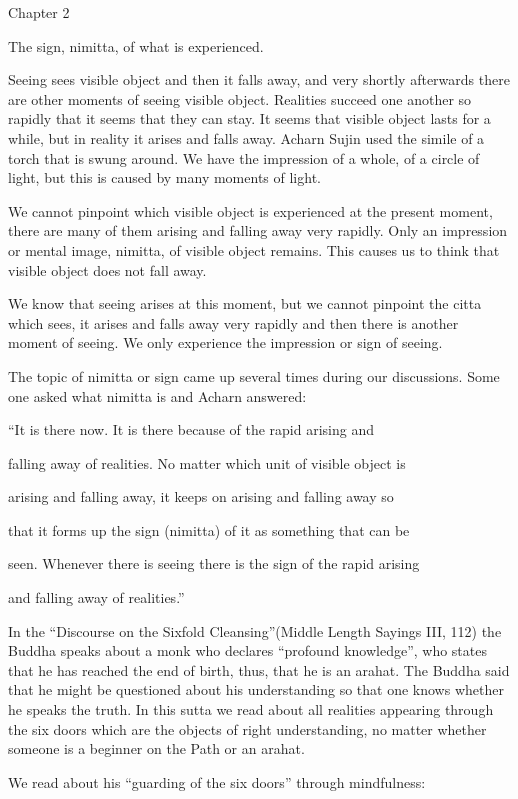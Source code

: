 \documentclass[10pt,a4paper,final]{article}
\begin{document}
Chapter 2

The sign, nimitta, of what is experienced.

Seeing sees visible object and then it falls away, and very
shortly afterwards there are other moments of seeing visible object.
Realities succeed one another so rapidly that it seems that they can
stay. It seems that visible object lasts
for a while, but in reality it arises and
falls away. Acharn Sujin used the simile
of a torch that is swung around. We
have the impression of a whole, of a
circle of light, but this is caused by
many moments of light. 

We cannot pinpoint which visible object
is experienced at the
present moment, there are many of them arising and falling
away very rapidly. Only an
impression or mental image, nimitta, of visible
object remains. This
causes us to think that
visible object does not fall
away. 

We know that seeing arises at this
moment, but we cannot pinpoint the 
citta which
sees, it arises and falls away very rapidly and then there is
another moment of seeing. We
only experience the impression or sign of seeing. 

The topic of nimitta or sign came up
several times during our discussions. Some one asked
what nimitta is and Acharn
answered:

``It is there now. It is
there because of the rapid arising and

falling away of
realities. No matter which unit of visible object is

arising and falling
away, it keeps on arising and falling away so

that it forms up the
sign (nimitta) of it as something that can be

seen. Whenever there is
seeing there is the sign of the rapid arising

and falling away of
realities.''

In the
``Discourse on the Sixfold
Cleansing''(Middle Length Sayings III,
112) the Buddha speaks about a monk who declares
``profound
knowledge'', who states that he has
reached the end of birth, thus, that he is an arahat. The Buddha said
that he might be questioned about his understanding so that one knows
whether he speaks the truth. In this sutta we read about all realities
appearing through the six doors which are the objects of right
understanding, no matter whether someone is a beginner on the Path or an
arahat. 

We read about his
``guarding of the six doors''
through mindfulness:
\end{document}
